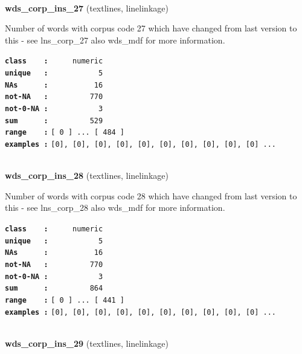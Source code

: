 \documentclass[]{article}
\begin{document}
~

\textbf{wds\_corp\_ins\_27} (textlines, linelinkage)

Number of words with corpus code 27 which have changed from last version
to this - see lns\_corp\_27 also wds\_mdf for more information.

\textbf{\texttt{class\ \ \ \ :}} \texttt{~~~~~numeric}\\
\textbf{\texttt{unique\ \ \ :}} \texttt{~~~~~~~~~~~5}\\
\textbf{\texttt{NAs\ \ \ \ \ \ :}} \texttt{~~~~~~~~~~16}\\
\textbf{\texttt{not-NA\ \ \ :}} \texttt{~~~~~~~~~770}\\
\textbf{\texttt{not-0-NA\ :}} \texttt{~~~~~~~~~~~3}\\
\textbf{\texttt{sum\ \ \ \ \ \ :}} \texttt{~~~~~~~~~529}\\
\textbf{\texttt{range\ \ \ \ :}}
\texttt{{[}\ 0\ {]}\ ...\ {[}\ 484\ {]}}\\
\textbf{\texttt{examples\ :}}
\texttt{{[}0{]},\ {[}0{]},\ {[}0{]},\ {[}0{]},\ {[}0{]},\ {[}0{]},\ {[}0{]},\ {[}0{]},\ {[}0{]},\ {[}0{]}\ ...}\\

~

\textbf{wds\_corp\_ins\_28} (textlines, linelinkage)

Number of words with corpus code 28 which have changed from last version
to this - see lns\_corp\_28 also wds\_mdf for more information.

\textbf{\texttt{class\ \ \ \ :}} \texttt{~~~~~numeric}\\
\textbf{\texttt{unique\ \ \ :}} \texttt{~~~~~~~~~~~5}\\
\textbf{\texttt{NAs\ \ \ \ \ \ :}} \texttt{~~~~~~~~~~16}\\
\textbf{\texttt{not-NA\ \ \ :}} \texttt{~~~~~~~~~770}\\
\textbf{\texttt{not-0-NA\ :}} \texttt{~~~~~~~~~~~3}\\
\textbf{\texttt{sum\ \ \ \ \ \ :}} \texttt{~~~~~~~~~864}\\
\textbf{\texttt{range\ \ \ \ :}}
\texttt{{[}\ 0\ {]}\ ...\ {[}\ 441\ {]}}\\
\textbf{\texttt{examples\ :}}
\texttt{{[}0{]},\ {[}0{]},\ {[}0{]},\ {[}0{]},\ {[}0{]},\ {[}0{]},\ {[}0{]},\ {[}0{]},\ {[}0{]},\ {[}0{]}\ ...}\\

~

\textbf{wds\_corp\_ins\_29} (textlines, linelinkage)
\end{document}
